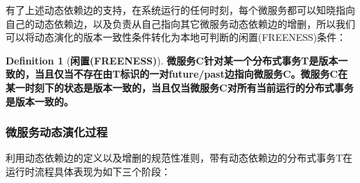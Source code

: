 \documentclass[a4paper]{article}
\theoremstyle{definition}
\newtheorem{definition}{Definition}[section]
\begin{document}
有了上述动态依赖边的支持，在系统运行的任何时刻，每个微服务都可以知晓指向自己的动态依赖边，以及负责从自己指向其它微服务动态依赖边的增删，所以我们可以将动态演化的版本一致性条件转化为本地可判断的闲置(FREENESS)条件：

\begin{definition}[\textbf{闲置(FREENESS)}]
\label{definition:freeness}
\textbf{微服务C针对某一个分布式事务T是版本一致的，当且仅当不存在由T标识的一对future/past边指向微服务C。微服务C在某一时刻下的状态是版本一致的，当且仅当微服务C对所有当前运行的分布式事务是版本一致的。}
\end{definition}


\subsubsection{微服务动态演化过程}
利用动态依赖边的定义以及增删的规范性准则，带有动态依赖边的分布式事务T在运行时流程具体表现为如下三个阶段：
\end{document}
